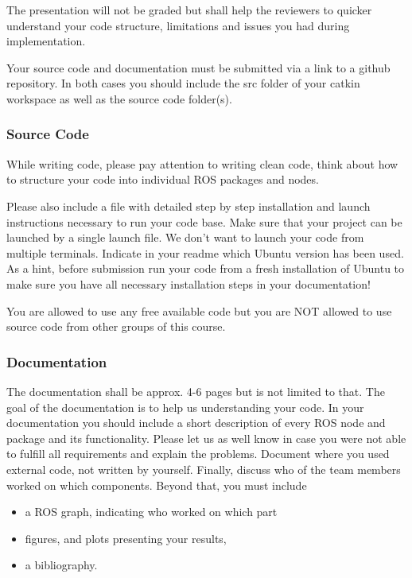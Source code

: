 \documentclass{article}
\begin{document}
The presentation will not be graded but shall help the reviewers to quicker understand your code structure, limitations and issues you had during implementation.

Your source code and documentation must be submitted via a link to a github repository.
In both cases you should include the src folder of your catkin workspace as well as the source code folder(s).

\subsubsection{Source Code}
While writing code, please pay attention to writing clean code, think about how to structure your code into individual ROS packages and nodes.

Please also include a  file with detailed step by step installation and launch instructions necessary to run your code base. Make sure that your project can be launched by a single launch file. We don't want to launch your code from multiple terminals. Indicate in your readme which Ubuntu version has been used. As a hint, before submission run your code from a fresh installation of Ubuntu to make sure you have all necessary installation steps in your documentation!

You are allowed to use any free available code but you are NOT allowed to use source code from other groups of this course.

\subsubsection{Documentation}
The documentation shall be approx. 4-6 pages but is not limited to that. The goal of the documentation is to help us understanding your code. In your documentation you should include a short description of every ROS node and package and its functionality. Please let us as well know in case you were not able to fulfill all requirements and explain the problems. Document where you used external code, not written by yourself. Finally, discuss who of the team members worked on which components. Beyond that, you must include 
\begin{itemize}
\item a ROS graph, indicating who worked on which part
\item figures, and plots presenting your results,
\item a bibliography.
\end{itemize}
\end{document}
